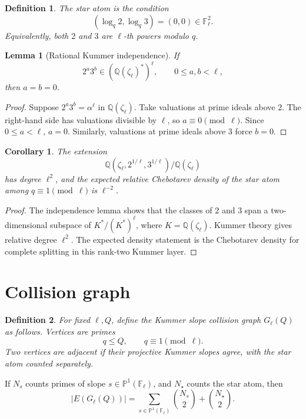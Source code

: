 \documentclass[11pt]{article}
\newtheorem{lemma}{Lemma}
\newtheorem{corollary}{Corollary}
\newtheorem{definition}{Definition}
\newcommand{\Q}{\mathbb Q}
\newcommand{\F}{\mathbb F}
\newcommand{\1}{\mathbf 1}
\begin{document}
\begin{definition}
The star atom is the condition
\[
(\log_q2,\log_q3)=(0,0)\in\F_\ell^2.
\]
Equivalently, both \(2\) and \(3\) are \(\ell\)-th powers modulo \(q\).
\end{definition}

\begin{lemma}[Rational Kummer independence]\label{L:indep}
If
\[
2^a3^b\in(\Q(\zeta_\ell)^*)^\ell,\qquad 0\le a,b<\ell,
\]
then \(a=b=0\).
\end{lemma}

\begin{proof}
Suppose \(2^a3^b=\alpha^\ell\) in \(\Q(\zeta_\ell)\).  Take valuations at prime ideals above \(2\).  The right-hand side has valuations divisible by \(\ell\), so \(a\equiv0\pmod\ell\).  Since \(0\le a<\ell\), \(a=0\).  Similarly, valuations at prime ideals above \(3\) force \(b=0\).
\end{proof}

\begin{corollary}
The extension
\[
\Q(\zeta_\ell,2^{1/\ell},3^{1/\ell})/\Q(\zeta_\ell)
\]
has degree \(\ell^2\), and the expected relative Chebotarev density of the star atom among \(q\equiv1\pmod\ell\) is \(\ell^{-2}\).
\end{corollary}

\begin{proof}
The independence lemma shows that the classes of \(2\) and \(3\) span a two-dimensional subspace of \(K^*/(K^*)^\ell\), where \(K=\Q(\zeta_\ell)\).  Kummer theory gives relative degree \(\ell^2\).  The expected density statement is the Chebotarev density for complete splitting in this rank-two Kummer layer.
\end{proof}

\section{Collision graph}

\begin{definition}
For fixed \(\ell,Q\), define the Kummer slope collision graph \(G_\ell(Q)\) as follows.  Vertices are primes
\[
q\le Q,\qquad q\equiv1\pmod\ell.
\]
Two vertices are adjacent if their projective Kummer slopes agree, with the star atom counted separately.
\end{definition}

If \(N_s\) counts primes of slope \(s\in\mathbb P^1(\F_\ell)\), and \(N_\star\) counts the star atom, then
\[
|E(G_\ell(Q))|=
\sum_{s\in\mathbb P^1(\F_\ell)}\binom{N_s}{2}
+
\binom{N_\star}{2}.
\]
\end{document}
